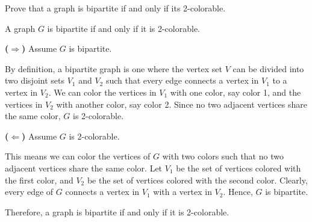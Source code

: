 \documentclass[a4paper]{exam}
\begin{document}
\begin{questions}
Prove that a graph is bipartite if and only if its 2-colorable.

\begin{solution}
A graph $G$ is bipartite if and only if it is 2-colorable.

\textbf{($\Rightarrow$)} Assume $G$ is bipartite. 

By definition, a bipartite graph is one where the vertex set $V$ can be divided into two disjoint sets $V_1$ and $V_2$ such that every edge connects a vertex in $V_1$ to a vertex in $V_2$. We can color the vertices in $V_1$ with one color, say color 1, and the vertices in $V_2$ with another color, say color 2. Since no two adjacent vertices share the same color, $G$ is 2-colorable.

\textbf{($\Leftarrow$)} Assume $G$ is 2-colorable. 

This means we can color the vertices of $G$ with two colors such that no two adjacent vertices share the same color. Let $V_1$ be the set of vertices colored with the first color, and $V_2$ be the set of vertices colored with the second color. Clearly, every edge of $G$ connects a vertex in $V_1$ with a vertex in $V_2$. Hence, $G$ is bipartite.

Therefore, a graph is bipartite if and only if it is 2-colorable.
\end{solution}

\end{questions}
\end{document}

